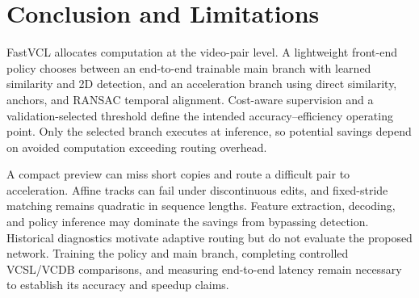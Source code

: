 \section{Conclusion and Limitations}
\label{sec:conclusion}
FastVCL allocates computation at the video-pair level. A lightweight front-end policy chooses
between an end-to-end trainable main branch with learned similarity and 2D detection, and an
acceleration branch using direct similarity, anchors, and RANSAC temporal alignment.
Cost-aware supervision and a validation-selected threshold define the intended
accuracy--efficiency operating point. Only the selected branch executes at inference, so
potential savings depend on avoided computation exceeding routing overhead.

A compact preview can miss short copies and route a difficult pair to acceleration.
Affine tracks can fail under discontinuous edits, and fixed-stride matching remains quadratic
in sequence lengths. Feature extraction, decoding, and policy inference may dominate the
savings from bypassing detection. Historical diagnostics motivate adaptive routing but do
not evaluate the proposed network. Training the policy and main branch, completing controlled
VCSL/VCDB comparisons, and measuring end-to-end latency remain necessary to establish its
accuracy and speedup claims.
